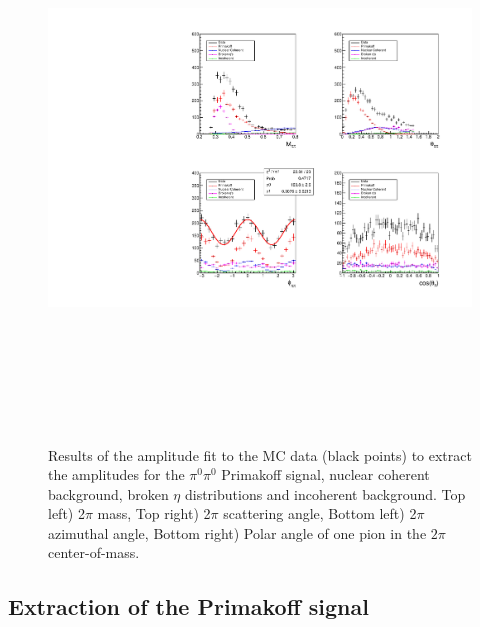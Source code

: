  \begin{figure}[tbp]
\begin{center}
\includegraphics[height=15cm,clip=true]{figures/twopi_primakoff_DSelect_test_File_100000_decomposition_PrimNCICeta.pdf}
\caption{Results of the amplitude fit to the MC data (black points) to extract the amplitudes for the $\pi^0\pi^0$ Primakoff signal, nuclear coherent background, broken $\eta$ distributions and incoherent background.
Top left) 2$\pi$ mass, Top right) 2$\pi$ scattering angle, Bottom left) 2$\pi$ azimuthal angle, 
Bottom right) Polar angle of one pion in the $2\pi$ center-of-mass.
\label{fig:decomposition_PrimNCICeta}}
\end{center} 
\end{figure}

\subsection{Extraction of the Primakoff signal \label{sec:signalfit}}

